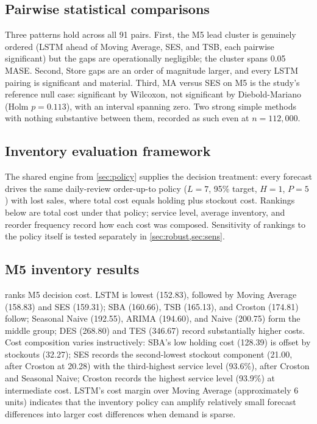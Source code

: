 \subsection{Pairwise statistical comparisons}
\label{sec:spotlight}
Three patterns hold across all 91 pairs. First, the M5 lead cluster is
genuinely ordered (LSTM ahead of Moving Average, SES, and TSB, each pairwise
significant) but the gaps are operationally negligible; the cluster spans
0.05 MASE. Second, Store gaps are an order of magnitude larger, and every
LSTM pairing is significant and material. Third, MA versus SES on M5 is the
study's reference null case: significant by Wilcoxon, not significant by
Diebold-Mariano (Holm $p=0.113$), with an interval spanning zero. Two strong
simple methods with nothing substantive between them, recorded as such even
at $n=112{,}000$.

\subsection{Inventory evaluation framework}
\label{sec:inv-frame}
The shared engine from \cref{sec:policy} supplies the decision treatment:
every forecast drives the same daily-review order-up-to policy ($L=7$, 95\%
target, $H=1$, $P=5$) with lost sales, where total cost equals holding plus
stockout cost. Rankings below are total cost under that policy; service
level, average inventory, and reorder frequency record how each cost was
composed. Sensitivity of rankings to the policy itself is tested separately
in \cref{sec:robust,sec:sens}.

\subsection{M5 inventory results}
\label{sec:m5-inv}
 ranks M5 decision cost. LSTM is lowest (152.83), followed by
Moving Average (158.83) and SES (159.31); SBA (160.66), TSB (165.13), and
Croston (174.81) follow; Seasonal Naive (192.55), ARIMA (194.60), and Naive
(200.75) form the middle group; DES (268.80) and TES (346.67) record
substantially higher costs. Cost composition varies instructively: SBA's low
holding cost (128.39) is offset by stockouts (32.27); SES records the second-lowest
stockout component (21.00, after Croston at 20.28) with the third-highest service level (93.6\%), after Croston and Seasonal Naive;
Croston records the highest service level (93.9\%) at intermediate cost.
LSTM's cost margin over Moving Average (approximately 6 units) indicates that the inventory policy can amplify relatively small forecast differences into larger cost differences when demand is sparse.

